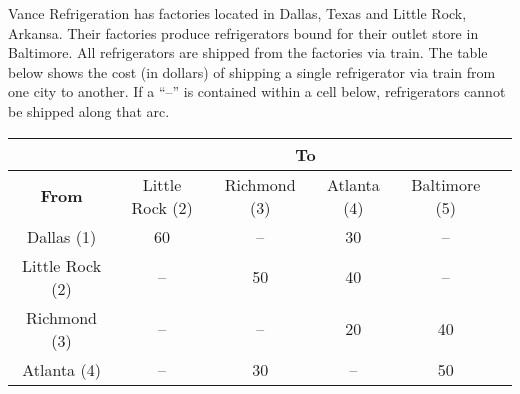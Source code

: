 \documentclass[12pt]{exam}
\begin{document}
\begin{questions}
\begin{parts}
\end{parts}


\newpage
\question Vance Refrigeration has factories located in Dallas, Texas and Little Rock, Arkansa.  Their factories produce refrigerators bound for their outlet store in Baltimore. All refrigerators are shipped from the factories via train. The table below shows the cost (in dollars) of shipping a single refrigerator via train from one city to another. If a ``--'' is contained within a cell below, refrigerators cannot be shipped along that arc.


\begin{center}
\begin{tabular}{ |c|c|c|c|c|c| } 
    \hline
    & \multicolumn{4}{c|}{ \textbf{To} }\\
    \hline
    \textbf{From} & Little Rock (2) & Richmond (3) & Atlanta (4) & Baltimore (5) \\ 
    \hline
    Dallas (1)  & 60 & -- & 30 & --  \\ 
    \hline
    Little Rock (2) & --  & 50 & 40 &-- \\ 
    \hline
    Richmond (3) &  -- & -- & 20 & 40    \\ 
    \hline
    Atlanta (4) & -- & 30 & --  & 50 \\ 
    \hline
\end{tabular}
\end{center}


\end{questions}
\end{document}

